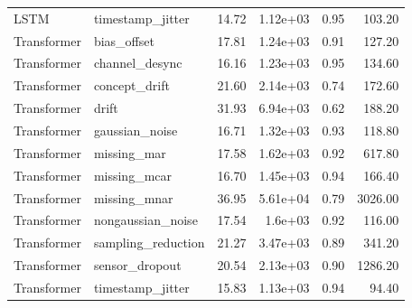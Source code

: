 \begin{table}
\begin{tabular}{llrrrr}
LSTM & timestamp\_jitter & 14.72 & 1.12e+03 & 0.95 & 103.20 \\
Transformer & bias\_offset & 17.81 & 1.24e+03 & 0.91 & 127.20 \\
Transformer & channel\_desync & 16.16 & 1.23e+03 & 0.95 & 134.60 \\
Transformer & concept\_drift & 21.60 & 2.14e+03 & 0.74 & 172.60 \\
Transformer & drift & 31.93 & 6.94e+03 & 0.62 & 188.20 \\
Transformer & gaussian\_noise & 16.71 & 1.32e+03 & 0.93 & 118.80 \\
Transformer & missing\_mar & 17.58 & 1.62e+03 & 0.92 & 617.80 \\
Transformer & missing\_mcar & 16.70 & 1.45e+03 & 0.94 & 166.40 \\
Transformer & missing\_mnar & 36.95 & 5.61e+04 & 0.79 & 3026.00 \\
Transformer & nongaussian\_noise & 17.54 & 1.6e+03 & 0.92 & 116.00 \\
Transformer & sampling\_reduction & 21.27 & 3.47e+03 & 0.89 & 341.20 \\
Transformer & sensor\_dropout & 20.54 & 2.13e+03 & 0.90 & 1286.20 \\
Transformer & timestamp\_jitter & 15.83 & 1.13e+03 & 0.94 & 94.40 \\
\bottomrule
\end{tabular}
\end{table}
